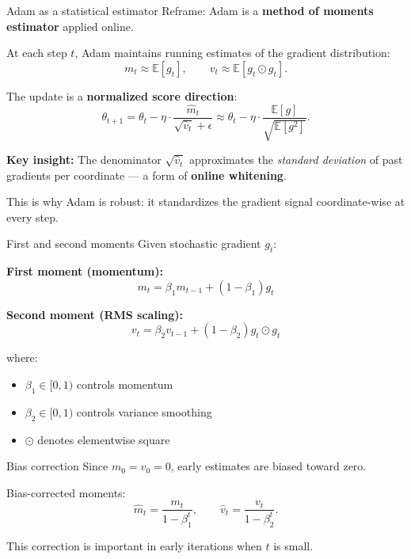 \documentclass[compress]{beamer}
\begin{document}
\begin{frame}{Adam as a statistical estimator}
Reframe: Adam is a \textbf{method of moments estimator} applied online.

\medskip
At each step $t$, Adam maintains running estimates of the gradient distribution:
\[
m_t \approx \mathbb{E}[g_t], \qquad v_t \approx \mathbb{E}[g_t \odot g_t].
\]

The update is a \textbf{normalized score direction}:
\[
\theta_{t+1} = \theta_t - \eta \cdot \frac{\hat{m}_t}{\sqrt{\hat{v}_t} + \epsilon}
\approx \theta_t - \eta \cdot \frac{\mathbb{E}[g]}{\sqrt{\mathbb{E}[g^2]}}.
\]

\medskip
\textbf{Key insight:} The denominator $\sqrt{\hat{v}_t}$ approximates the \emph{standard deviation} of past gradients per coordinate --- a form of \textbf{online whitening}.

\medskip
This is why Adam is robust: it standardizes the gradient signal coordinate-wise at every step.
\end{frame}

\begin{frame}{First and second moments}
Given stochastic gradient $g_t$:

\textbf{First moment (momentum):}
\[
m_t = \beta_1 m_{t-1} + (1-\beta_1) g_t
\]

\textbf{Second moment (RMS scaling):}
\[
v_t = \beta_2 v_{t-1} + (1-\beta_2) g_t \odot g_t
\]

where:
\begin{itemize}
\item $\beta_1 \in [0,1)$ controls momentum
\item $\beta_2 \in [0,1)$ controls variance smoothing
\item $\odot$ denotes elementwise square
\end{itemize}
\end{frame}

\begin{frame}{Bias correction}
Since $m_0=v_0=0$, early estimates are biased toward zero.

Bias-corrected moments:
\[
\hat m_t = \frac{m_t}{1-\beta_1^t},
\qquad
\hat v_t = \frac{v_t}{1-\beta_2^t}.
\]

This correction is important in early iterations when $t$ is small.
\end{frame}
\end{document}
